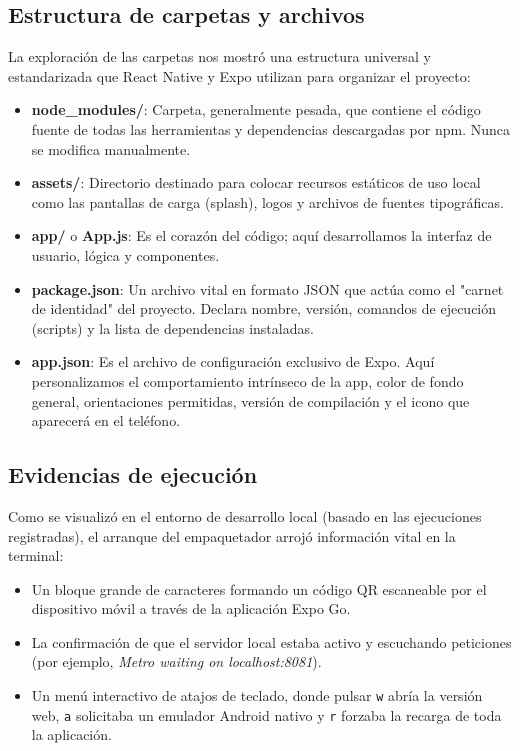 \documentclass[12pt,a4paper]{article}
\begin{document}
\subsection{Estructura de carpetas y archivos}
La exploración de las carpetas nos mostró una estructura universal y estandarizada que React Native y Expo utilizan para organizar el proyecto:
\begin{itemize}
    \item \textbf{node\_modules/}: Carpeta, generalmente pesada, que contiene el código fuente de todas las herramientas y dependencias descargadas por npm. Nunca se modifica manualmente.
    \item \textbf{assets/}: Directorio destinado para colocar recursos estáticos de uso local como las pantallas de carga (splash), logos y archivos de fuentes tipográficas.
    \item \textbf{app/} o \textbf{App.js}: Es el corazón del código; aquí desarrollamos la interfaz de usuario, lógica y componentes.
    \item \textbf{package.json}: Un archivo vital en formato JSON que actúa como el "carnet de identidad" del proyecto. Declara nombre, versión, comandos de ejecución (scripts) y la lista de dependencias instaladas.
    \item \textbf{app.json}: Es el archivo de configuración exclusivo de Expo. Aquí personalizamos el comportamiento intrínseco de la app, color de fondo general, orientaciones permitidas, versión de compilación y el icono que aparecerá en el teléfono.
\end{itemize}

\subsection{Evidencias de ejecución}
Como se visualizó en el entorno de desarrollo local (basado en las ejecuciones registradas), el arranque del empaquetador arrojó información vital en la terminal:
\begin{itemize}
    \item Un bloque grande de caracteres formando un código QR escaneable por el dispositivo móvil a través de la aplicación Expo Go.
    \item La confirmación de que el servidor local estaba activo y escuchando peticiones (por ejemplo, \textit{Metro waiting on localhost:8081}).
    \item Un menú interactivo de atajos de teclado, donde pulsar \texttt{w} abría la versión web, \texttt{a} solicitaba un emulador Android nativo y \texttt{r} forzaba la recarga de toda la aplicación.
\end{itemize}
\end{document}
